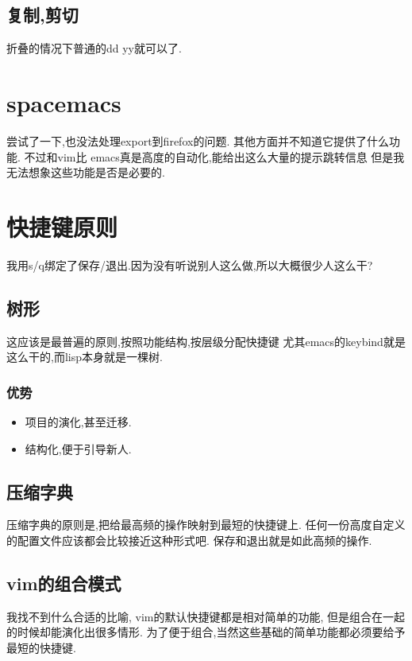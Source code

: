 \documentclass[12pt,a4paper]{article}
\begin{document}
\subsection{复制,剪切}
\label{sec:orgheadline84}
折叠的情况下普通的dd yy就可以了.
\section{spacemacs}
\label{sec:orgheadline86}
  尝试了一下,也没法处理export到firefox的问题.
  其他方面并不知道它提供了什么功能.
不过和vim比 emacs真是高度的自动化,能给出这么大量的提示跳转信息
但是我无法想象这些功能是否是必要的.

\section{快捷键原则}
\label{sec:orgheadline91}
我用s/q绑定了保存/退出.因为没有听说别人这么做,所以大概很少人这么干?
\subsection{树形}
\label{sec:orgheadline88}
这应该是最普遍的原则,按照功能结构,按层级分配快捷键
尤其emacs的keybind就是这么干的,而lisp本身就是一棵树.
\subsubsection{优势}
\label{sec:orgheadline87}
\begin{itemize}
\item 项目的演化,甚至迁移.
\item 结构化,便于引导新人.
\end{itemize}
\subsection{压缩字典}
\label{sec:orgheadline89}
压缩字典的原则是,把给最高频的操作映射到最短的快捷键上.
任何一份高度自定义的配置文件应该都会比较接近这种形式吧.
保存和退出就是如此高频的操作.
\subsection{vim的组合模式}
\label{sec:orgheadline90}
我找不到什么合适的比喻,
vim的默认快捷键都是相对简单的功能,
但是组合在一起的时候却能演化出很多情形.
为了便于组合,当然这些基础的简单功能都必须要给予最短的快捷键.
\end{document}
